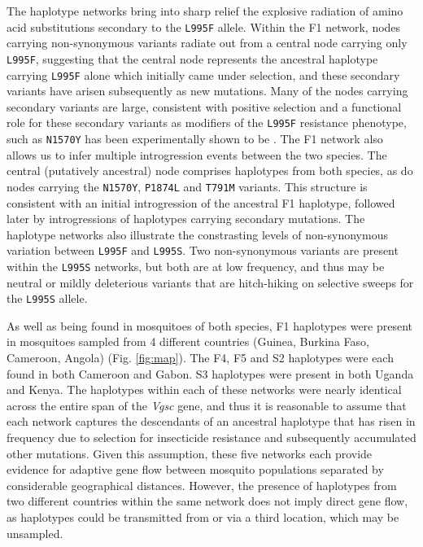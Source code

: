 \documentclass[a4paper,11pt,abstracton,hidelinks]{scrartcl}
\begin{document}
%
The haplotype networks bring into sharp relief the explosive radiation of amino acid substitutions secondary to the \texttt{L995F} allele.
%
Within the F1 network, nodes carrying non-synonymous variants radiate out from a central node carrying only \texttt{L995F}, suggesting that the central node represents the ancestral haplotype carrying \texttt{L995F} alone which initially came under selection, and these secondary variants have arisen subsequently as new mutations.
%
Many of the nodes carrying secondary variants are large, consistent with positive selection and a functional role for these secondary variants as modifiers of the \texttt{L995F} resistance phenotype, such as \texttt{N1570Y} has been experimentally shown to be \cite{Wang2015}. 
%
The F1 network also allows us to infer multiple introgression events between the two species.
%
The central (putatively ancestral) node comprises haplotypes from both species, as do nodes carrying the \texttt{N1570Y}, \texttt{P1874L} and \texttt{T791M} variants.
%
This structure is consistent with an initial introgression of the ancestral F1 haplotype, followed later by introgressions of haplotypes carrying secondary mutations.
%
The haplotype networks also illustrate the constrasting levels of non-synonymous variation between \texttt{L995F} and \texttt{L995S}. 
%
Two non-synonymous variants are present within the \texttt{L995S} networks, but both are at low frequency, and thus may be neutral or mildly deleterious variants that are hitch-hiking on selective sweeps for the \texttt{L995S} allele.

%
As well as being found in mosquitoes of both species, F1 haplotypes were present in mosquitoes sampled from 4 different countries (Guinea, Burkina Faso, Cameroon, Angola) (Fig. \ref{fig:map}).
%
The F4, F5 and S2 haplotypes were each found in both Cameroon and Gabon.
%
S3 haplotypes were present in both Uganda and Kenya.
%
The haplotypes within each of these networks were nearly identical across the entire span of the \textit{Vgsc} gene, and thus it is reasonable to assume that each network captures the descendants of an ancestral haplotype that has risen in frequency due to selection for insecticide resistance and subsequently accumulated other mutations.
%
Given this assumption, these five networks each provide evidence for adaptive gene flow between mosquito populations separated by considerable geographical distances.
%
However, the presence of haplotypes from two different countries within the same network does not imply direct gene flow, as haplotypes could be transmitted from or via a third location, which may be unsampled.
%
\end{document}
